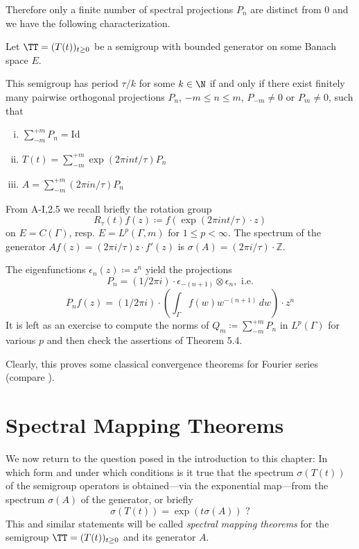 \newpage
Therefore only a finite number of spectral projections $P_{n}$ are distinct from $0$ and we have the following characterization.

\begin{corollary}\label{cor:a3-5.5}

Let $\TT = (T(t))_{t \geq 0}$ be a semigroup with bounded generator on some Banach space $E$.

This semigroup has period $\tau/k$ for some $k \in \N$ if and only if there exist finitely many pairwise orthogonal projections $P_{n}$, $-m \leq n \leq m$, $P_{-m} \neq 0$ or $P_{m} \neq 0$, such that
\begin{enumerate}[(i)]
\item $\sum_{-m}^{+m} P_{n} = \text{Id}$

\item $T(t) = \sum_{-m}^{+m} \exp(2\pi int/\tau)P_{n}$

\item $A = \sum_{-m}^{+m} (2\pi in/\tau)P_{n}$
\end{enumerate}
\end{corollary}

\begin{example}\label{ex:a3-5.6}

From A-I,2.5 we recall briefly the rotation group 
\[
R_{\tau}(t)f(z) \coloneqq f(\exp(2\pi int/\tau) \cdot z)
\]
on $E = C(\Gamma)$, resp. $E = L^{p}(\Gamma,m)$ for $1 \leq p < \infty$.
The spectrum of the generator\quad
$Af(z) = (2\pi i/\tau)z \cdot f'(z)$\quad
is \quad $\sigma(A) = (2\pi i/\tau)\cdot\mathbb{Z}$.

The eigenfunctions $\epsilon_{n}(z) \coloneqq z^{n}$ yield the projections
\[
P_{n} = (1/2\pi i)\cdot\epsilon_{-(n+1)} \otimes \epsilon_{n}, \text{ i.e.}
\]
\[
P_{n}f(z) = (1/2\pi i)\cdot(\int_{\Gamma} f(w)w^{-(n+1)} \, dw)\cdot z^{n}
\]
It is left as an exercise to compute the norms of $Q_{m} \coloneqq \sum_{-m}^{+m} P_{n}$ in $L^{p}(\Gamma)$ for various $p$ and then check the assertions of Theorem 5.4.

Clearly, this proves some classical convergence theorems for Fourier series (compare \citet[Chap.8.1]{davies:1980}).
\end{example}

\section{Spectral Mapping Theorems}\label{sec:a3-6}
We now return to the question posed in the introduction to this chapter: In which form and under which conditions is it true that the spectrum $\sigma(T(t))$ of the semigroup operators is obtained---via the exponential map---from the spectrum $\sigma(A)$ of the generator, or briefly
\[
\sigma(T(t)) = \exp(t\sigma(A)) \text{ ?}
\]
This and similar statements will be called \emph{spectral mapping theorems} for the semigroup $\TT = (T(t))_{t \geq 0}$ and its generator $A$.


